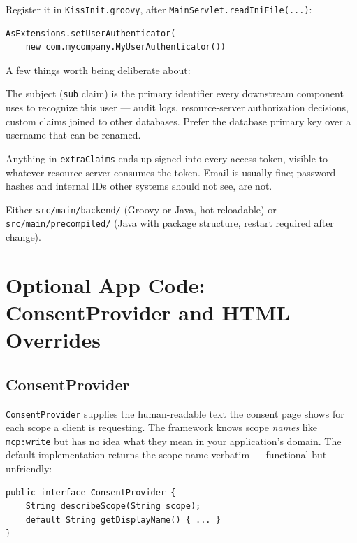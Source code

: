 \noindent
Register it in \texttt{KissInit.groovy}, after \texttt{MainServlet.read\-IniFile(...)}:

\begin{lstlisting}[style=groovy]
AsExtensions.setUserAuthenticator(
    new com.mycompany.MyUserAuthenticator())
\end{lstlisting}

\noindent
A few things worth being deliberate about:

\begin{description}[style=nextline]
  \item[Use a stable subject.]  The subject (\texttt{sub} claim) is the primary identifier every downstream component uses to recognize this user --- audit logs, resource-server authorization decisions, custom claims joined to other databases.  Prefer the database primary key over a username that can be renamed.
  \item[Be deliberate about extra claims.]  Anything in \texttt{extraClaims} ends up signed into every access token, visible to whatever resource server consumes the token.  Email is usually fine; password hashes and internal IDs other systems should not see, are not.
  \item[Implementations live in app code.]  Either \texttt{src/main/backend/} (Groovy or Java, hot-reloadable) or \texttt{src/main/precompiled/} (Java with package structure, restart required after change).
\end{description}

\section{Optional App Code: ConsentProvider and HTML Overrides}
\label{sec:as-consent}

\subsection{ConsentProvider}

\texttt{ConsentProvider} supplies the human-readable text the consent page shows for each scope a client is requesting.  The framework knows scope \emph{names} like \texttt{mcp:write} but has no idea what they mean in your application's domain.  The default implementation returns the scope name verbatim --- functional but unfriendly:

\begin{lstlisting}[style=java]
public interface ConsentProvider {
    String describeScope(String scope);
    default String getDisplayName() { ... }
}
\end{lstlisting}

